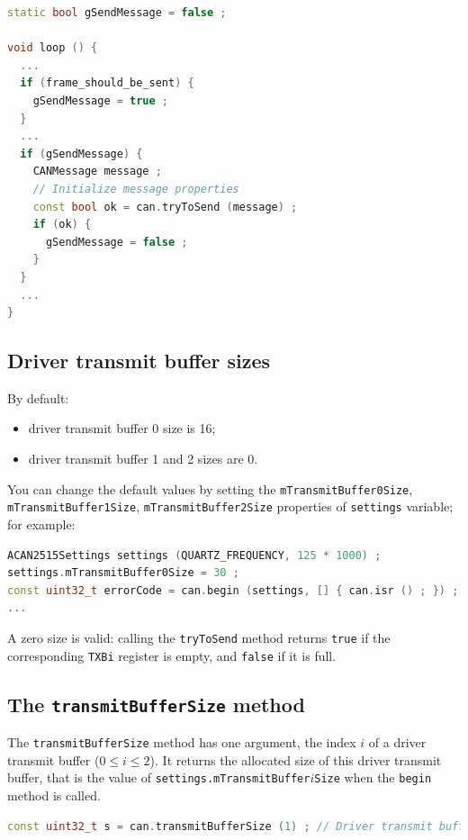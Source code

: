 \documentclass[10pt, a4paper, obeyspaces, openany]{extarticle}
\newcommand \subsectionLabel[2]{\subsection{#1}\label{subsec:#2}}
\begin{document}
{ \small
  \begin{lstlisting}[language=c++]
static bool gSendMessage = false ;

void loop () {
  ...
  if (frame_should_be_sent) {
    gSendMessage = true ;
  }
  ...
  if (gSendMessage) {
    CANMessage message ;
    // Initialize message properties
    const bool ok = can.tryToSend (message) ;
    if (ok) {
      gSendMessage = false ;
    }
  }
  ...
}
  \end{lstlisting}
}


\subsectionLabel{Driver transmit buffer sizes}{driverTransmitBufferSize}

By default:
\begin{itemize}
  \item driver transmit buffer 0 size is 16;
  \item driver transmit buffer 1 and 2 sizes are 0.
\end{itemize}

You can change the default values by setting the \texttt{mTransmitBuffer0Size}, \texttt{mTransmitBuffer1Size}, \texttt{mTransmitBuffer2Size} properties of \texttt{settings} variable; for example:

{ \small\begin{lstlisting}[language=c++]
ACAN2515Settings settings (QUARTZ_FREQUENCY, 125 * 1000) ;
settings.mTransmitBuffer0Size = 30 ;
const uint32_t errorCode = can.begin (settings, [] { can.isr () ; }) ;
...
\end{lstlisting}}

A zero size is valid: calling the \texttt{tryToSend} method returns \texttt{true} if the corresponding \texttt{TXBi} register is empty, and \texttt{false} if it is full.



\subsection{The \texttt{transmitBufferSize} method}

The \texttt{transmitBufferSize} method has one argument, the index $i$ of a driver transmit buffer ($0 \leqslant i \leqslant 2$). It returns the allocated size of this driver transmit buffer, that is the value of \texttt{settings.mTransmitBuffer$i$Size} when the \texttt{begin} method is called.
{ \small\begin{lstlisting}[language=c++]
const uint32_t s = can.transmitBufferSize (1) ; // Driver transmit buffer 1
\end{lstlisting}}
\end{document}
